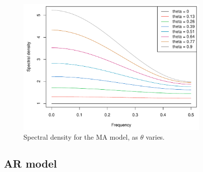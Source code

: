\documentclass{article}
\begin{document}
\begin{itemize}
\begin{figure}[htb]
\centering
\includegraphics[width=0.85\textwidth]{fig/spectral-density-ma-1.pdf}
\caption{Spectral density for the MA model, as $\theta$ varies.}
\label{fig:spectral_density_ma}
\end{figure}
\end{itemize}

\subsection{AR model}
\end{document}
